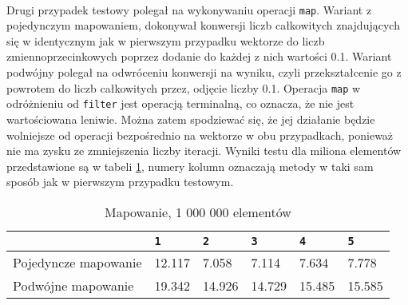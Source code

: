 \documentclass[a4paper,10pt]{report}
\begin{document}
\paragraph{}
Drugi przypadek testowy polegał na wykonywaniu operacji \verb|map|. Wariant z pojedynczym mapowaniem, dokonywał konwersji liczb całkowitych znajdujących się w identycznym jak w pierwszym przypadku wektorze do liczb zmiennoprzecinkowych poprzez dodanie do każdej z nich wartości 0.1. Wariant podwójny polegał na odwróceniu konwersji na wyniku, czyli przekształcenie go z powrotem do liczb całkowitych przez, odjęcie liczby 0.1. Operacja \verb|map| w odróżnieniu od \verb|filter| jest operacją terminalną, co oznacza, że nie jest wartościowana leniwie. Można zatem spodziewać się, że jej działanie będzie wolniejsze od operacji bezpośrednio na wektorze w obu przypadkach, ponieważ nie ma zysku ze zmniejszenia liczby iteracji. Wyniki testu dla miliona elementów przedstawione są w tabeli \ref{tab3}, numery kolumn oznaczają metody w taki sam sposób jak w pierwszym przypadku testowym.
\begin{table}[t]
	\caption{Mapowanie, 1 000 000 elementów}
	\label{tab3}
	\begin{tabular}{|l|l|l|l|l|l|}
		\hline 
		& \verb|1| & \verb|2| & \verb|3| & \verb|4| & \verb|5|\\
		\hline
		Pojedyncze mapowanie & 12.117 & 7.058 & 7.114 & 7.634 & 7.778 \\
		\hline
		Podwójne mapowanie & 19.342 & 14.926 & 14.729 & 15.485 & 15.585 \\
		\hline
	\end{tabular} 
\end{table}
\end{document}
